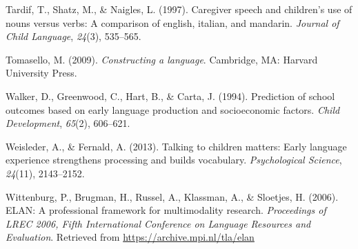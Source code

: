 \documentclass[
  man,floatsintext]{apa6}
\newlength{\cslhangindent}
\newlength{\cslentryspacingunit} %
\newenvironment{CSLReferences}[2] %
 {%
  \setlength{\parindent}{0pt}
  \ifodd #1
  \let\oldpar\par
  \def\par{\hangindent=\cslhangindent\oldpar}
  \fi
  \setlength{\parskip}{#2\cslentryspacingunit}
 }%
 {}
\begin{document}
\begin{CSLReferences}{1}{0}
\leavevmode{}%
Tardif, T., Shatz, M., \& Naigles, L. (1997). Caregiver speech and children's use of nouns versus verbs: A comparison of english, italian, and mandarin. \emph{Journal of Child Language}, \emph{24}(3), 535--565.

\leavevmode{}%
Tomasello, M. (2009). \emph{Constructing a language}. Cambridge, MA: Harvard University Press.

\leavevmode{}%
Walker, D., Greenwood, C., Hart, B., \& Carta, J. (1994). Prediction of school outcomes based on early language production and socioeconomic factors. \emph{Child Development}, \emph{65}(2), 606--621.

\leavevmode{}%
Weisleder, A., \& Fernald, A. (2013). Talking to children matters: Early language experience strengthens processing and builds vocabulary. \emph{Psychological Science}, \emph{24}(11), 2143--2152.

\leavevmode{}%
Wittenburg, P., Brugman, H., Russel, A., Klassman, A., \& Sloetjes, H. (2006). {ELAN}: {A} professional framework for multimodality research. \emph{Proceedings of LREC 2006, Fifth International Conference on Language Resources and Evaluation}. Retrieved from \url{https://archive.mpi.nl/tla/elan}

\end{CSLReferences}
\end{document}
